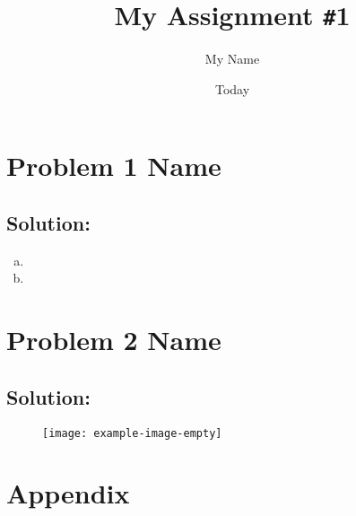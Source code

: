 \documentclass[
	12pt, %
]{fphw_assignment}
\title{My Assignment \texttt{\#}1}        %
\author{My Name}    %
\date{Today}        %
\institute{Department of Electrical and Electronics}              %
\begin{document}
\maketitle


\section{Problem 1 Name~\cite{book:zettili}}
\begin{problem}
  \lipsum[1][5-6]
\end{problem}

\subsection*{Solution:}
\blindtext
\begin{enumerate}[(a)]
\item 
\lipsum[2][5]
\item 
\lipsum[2][5]
\end{enumerate} 

\newpage
\section{Problem 2 Name~\cite{book:zettili}}
\begin{problem}
\lipsum[4][5-6]
\end{problem}

\subsection{Solution:}
\blindtext
\begin{figure}[!ht]
  \centering
  \texttt{[image: example-image-empty]}
  \caption{ \lipsum[5][2]\cite{book:griffiths}}
  \label{fig:fig1}
\end{figure}

\section{Appendix}
\begin{problem}
  \centering  \lipsum[6][3]
\end{problem}
{\footnotesize
\blindtext \cite{book:balakrishnan}
}

\newpage
\printbibliography
\end{document}

